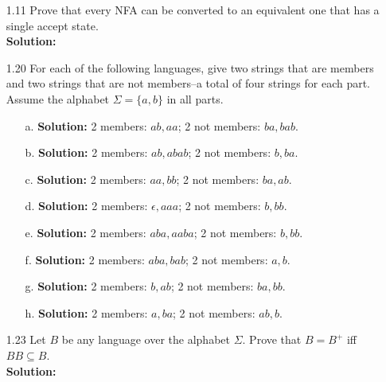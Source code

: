 \begin{enumerate}
\item[1.11]Prove that every NFA can be converted to an equivalent one that has a single accept state.
\\
\textbf{Solution:} \alreadyanswered

\item[1.20]For each of the following languages, give two strings that are members and two strings that are not members--a total of four strings for each part. Assume the alphabet $\Sigma = \{a,b\}$ in all parts.
\begin{enumerate}
\item[a.]\textbf{Solution:} 2 members: $ab, aa$; 2 not members: $ba, bab$.
\item[b.]\textbf{Solution:} 2 members: $ab, abab$; 2 not members: $b, ba$.
\item[c.]\textbf{Solution:} 2 members: $aa, bb$; 2 not members: $ba, ab$.
\item[d.]\textbf{Solution:} 2 members: $\epsilon, aaa$; 2 not members: $b, bb$.
\item[e.]\textbf{Solution:} 2 members: $aba, aaba$; 2 not members: $b, bb$.
\item[f.]\textbf{Solution:} 2 members: $aba, bab$; 2 not members: $a, b$.
\item[g.]\textbf{Solution:} 2 members: $b, ab$; 2 not members: $ba, bb$.
\item[h.]\textbf{Solution:} 2 members: $a, ba$; 2 not members: $ab, b$.
\end{enumerate}

\item[1.23]Let $B$ be any language over the alphabet $\Sigma$. Prove that $B = B^+$ iff $BB \subseteq B$.
\\
\textbf{Solution:} \alreadyanswered


\end{enumerate}

